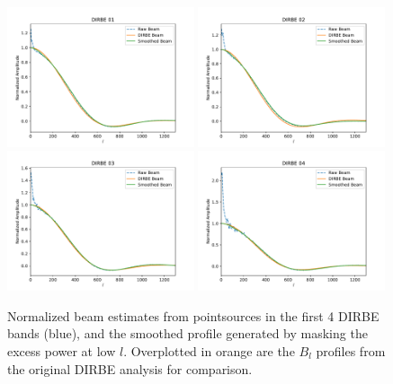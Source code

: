 \documentclass{aa}
\begin{document}
\begin{figure}
  \centering
  \includegraphics[width=0.49\textwidth]{figs/stacking/beam_01.pdf}
  \includegraphics[width=0.49\textwidth]{figs/stacking/beam_02.pdf}\\
  \includegraphics[width=0.49\textwidth]{figs/stacking/beam_03.pdf}
  \includegraphics[width=0.49\textwidth]{figs/stacking/beam_04.pdf}\\

  \caption{Normalized beam estimates from pointsources in the first 4 DIRBE bands (blue), and the smoothed profile generated by masking the excess power at low $l$. Overplotted in orange are the $B_l$ profiles from the original DIRBE analysis for comparison.}
  \label{fig:beams}
\end{figure}
\end{document}
